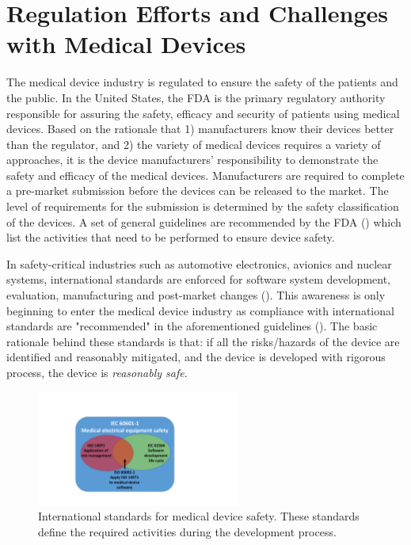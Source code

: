 \section{Regulation Efforts and Challenges with Medical Devices}
The medical device industry is regulated to ensure the safety of the patients and the public. In the United States, the FDA is the primary regulatory authority responsible for assuring the safety, efficacy and security of patients using medical devices. Based on the rationale that 1) manufacturers know their devices better than the regulator, and 2) the variety of medical devices requires a variety of approaches, it is the device manufacturers' responsibility to demonstrate the safety and efficacy of the medical devices. Manufacturers are required to complete a pre-market submission before the devices can be released to the market. The level of requirements for the submission is determined by the safety classification of the devices. A set of general guidelines are recommended by the FDA (\cite{fda1, fda2, fda3}) which list the activities that need to be performed to ensure device safety. 

In safety-critical industries such as automotive electronics, avionics and nuclear systems, international standards are enforced for software system development, evaluation, manufacturing and post-market changes (\cite{autosar,avsi}). This awareness is only beginning to enter the medical device industry as compliance with international standards are "recommended" in the aforementioned guidelines (\cite{formal_fda}). The basic rationale behind these standards is that: if all the risks/hazards of the device are identified and reasonably mitigated, and the device is developed with rigorous process, the device is \emph{reasonably safe}. 
\begin{figure}[t]
		\centering
		\includegraphics[width=0.6\textwidth]{figs/stardards.pdf}
		\caption{\small International standards for medical device safety. These standards define the required activities during the development process.}
		\label{fig:standards}
\end{figure}

